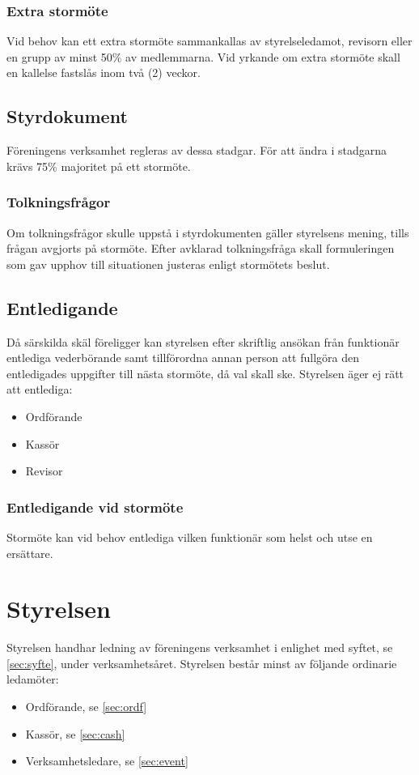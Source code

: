 \documentclass[11pt,a4paper]{article}
\begin{document}
\subsubsection{Extra stormöte}
Vid behov kan ett extra stormöte sammankallas av styrelseledamot, revisorn eller en grupp av minst 50\% av medlemmarna. Vid yrkande om extra stormöte skall en kallelse fastslås inom två (2) veckor.
\subsection{Styrdokument}
Föreningens verksamhet regleras av dessa stadgar. För att ändra i stadgarna krävs 75\% majoritet på ett stormöte.
\subsubsection{Tolkningsfrågor}
Om tolkningsfrågor skulle uppstå i styrdokumenten gäller styrelsens mening, tills frågan avgjorts på stormöte. Efter avklarad tolkningsfråga skall formuleringen som gav upphov till situationen justeras enligt stormötets beslut.
\subsection{Entledigande}
Då särskilda skäl föreligger kan styrelsen efter skriftlig ansökan från funktionär entlediga vederbörande samt tillförordna annan person att fullgöra den entledigades uppgifter till nästa stormöte, då val skall ske. Styrelsen äger ej rätt att entlediga:
\begin{itemize}
	\item Ordförande
	\item Kassör
	\item Revisor
\end{itemize}
\subsubsection{Entledigande vid stormöte}
Stormöte kan vid behov entlediga vilken funktionär som helst och utse en ersättare.

\section{Styrelsen}
Styrelsen handhar ledning av föreningens verksamhet i enlighet med syftet, se \ref{sec:syfte}, under verksamhetsåret. Styrelsen består minst av följande ordinarie ledamöter:
\begin{itemize}
	\item Ordförande, se \ref{sec:ordf}
	\item Kassör, se \ref{sec:cash}
	\item Verksamhetsledare, se \ref{sec:event}
\end{itemize}
\end{document}

